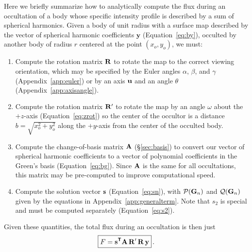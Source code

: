 \documentclass[modern]{aastex61}
\begin{document}
Here we briefly summarize how to analytically compute the flux during
an occultation of a body whose specific intensity profile is described
by a sum of spherical harmonics. Given a body of unit radius with a
surface map described by the vector of spherical harmonic coefficients
$\mathbf{y}$ (Equation~\ref{eq:by}), occulted by another body of radius $r$
centered at the point $(x_o, y_o)$, we must:
%
\begin{enumerate}
    \item Compute the rotation matrix ${\mathbf{R}}$ to rotate the map to the correct
          viewing orientation, which may be
          specified by the Euler angles $\alpha$, $\beta$, and $\gamma$
          (Appendix~\ref{app:euler}) or by an axis ${\mathbf{u}}$ and an angle $\theta$
          (Appendix~\ref{app:axisangle}).
    \item Compute the rotation matrix ${\mathbf{R'}}$ to rotate the map
          by an angle $\omega$ about the $+z$-axis
          (Equation~\ref{eq:zrot}) so the center of the occultor is a
          distance $b = \sqrt{x_o^2 + y_o^2}$ along the $+y$-axis
          from the center of the occulted body.
    \item Compute the change-of-basis matrix ${\mathbf{A}}$ (\S\ref{sec:basis}) to
          convert our vector of spherical harmonic coefficients to a vector
          of polynomial coefficients in the Green's basis
          (Equation~\ref{eq:bg}). Since ${\mathbf{A}}$ is the same for all
          occultations, this matrix may be pre-computed to improve
          computational speed.
    \item Compute the solution vector ${\mathbf{s}}$ (Equation~\ref{eq:sn}), with
          $\mathcal{P}({\mathbf{G}}_n)$ and $\mathcal{Q}({\mathbf{G}}_n)$ given by
          the equations in Appendix~\ref{app:generalterm}.
          Note that $s_2$ is special and must be computed separately
          (Equation~\ref{eq:s2}).
\end{enumerate}
%
Given these quantities, the total flux during an occultation is then just
%
\begin{equation}
    \label{eq:starry}
    \boxed{
        F = \bvec{s}^{\boldsymbol{\mathsf{T}}} \bvec{A} \, \bvec{R'} \, \bvec{R} \, \bvec{y}
        }
    \quad.
\end{equation}   %


\end{document}
